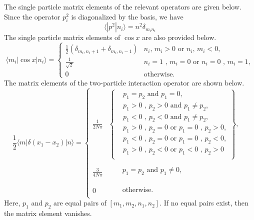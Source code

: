 The single particle matrix elements of the relevant operators are given below. Since the operator $p^2_i$ is diagonalized by the basis, we have
\begin{equation}
\langle|p^2|n_i\rangle = n^2 \delta_{m_in_i}
\end{equation}
The single particle matrix elements of $\cos{x}$ are also provided below.
\begin{equation}
\langle m_i | \cos{x} | n_i \rangle =\left\{
\begin{array}{lll}
\frac{1}{2}\left( \delta_{m_i,n_i+1}+\delta_{m_i,n_i-1}\right) & n_i \mbox{,  } m_i > 0 \mbox{ or } n_i \mbox{,  } m_i < 0,\\
\frac{1}{\sqrt{2}} & n_i=1 \mbox{ ,  } m_i=0 \mbox{ or } n_i=0 \mbox{ ,  } m_i=1,\\
0 & \mbox{otherwise}.
\end{array}
\right.
\end{equation}
The matrix elements of the two-particle interaction operator are shown below.
\begin{equation}
\frac{1}{2} \langle m | \delta(x_1-x_2) | n \rangle =\left\{
\begin{array}{lll}
\frac{1}{2N\pi} & \left\{ \begin{array}{lll}
 & p_1=p_2 \mbox{ and } p_1=0,\\
 & p_1>0 \mbox{ , } p_2>0 \mbox{ and } p_1\neq p_2, \\
 & p_1<0 \mbox{ , } p_2<0 \mbox{ and } p_1\neq p_2,\\
 & p_1>0 \mbox{ , } p_2=0 \mbox{ or } p_1=0 \mbox{ , } p_2>0,\\
 & p_1<0 \mbox{ , } p_2=0 \mbox{ or } p_1=0 \mbox{ , } p_2<0,\\
 & p_1>0 \mbox{ , } p_2<0 \mbox{ or } p_1<0 \mbox{ , } p_2>0\\
\end{array}\right\},\\
 & &  \\
\frac{3}{4N\pi} & \begin{array}{llll}
 & & p_1=p_2 \mbox{ and } p_1 \neq 0,\\
\end{array} \\
 & &  \\
0 & \begin{array}{llll}
 & & \mbox{otherwise}.\\
\end{array}
\end{array}
\right.
\end{equation}
Here, $p_1$ and $p_2$ are equal pairs of $[m_1,m_2,n_1,n_2]$. If no equal pairs exist, then the matrix element vanishes.
